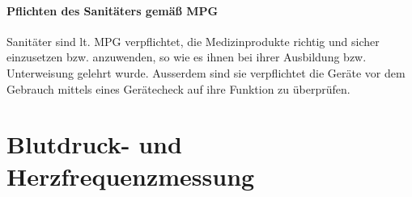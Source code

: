 \paragraph{Pflichten des Sanitäters gemäß MPG}

Sanitäter sind lt. MPG verpflichtet, die Medizinprodukte
richtig und sicher einzusetzen bzw. anzuwenden, so wie es
ihnen bei ihrer Ausbildung bzw. Unterweisung gelehrt wurde.
Ausserdem sind sie verpflichtet die Geräte vor dem Gebrauch
mittels eines Gerätecheck auf ihre Funktion zu überprüfen.

\section{Blutdruck- und Herzfrequenzmessung}

\label{topic:rr-messung}

